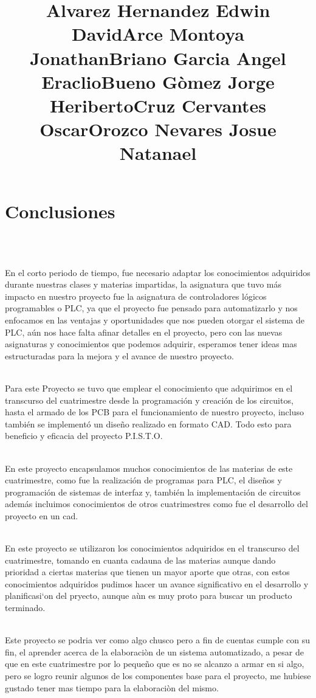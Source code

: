 \documentclass[12pt,a4paper]{article}
\begin{document}
\section{Conclusiones}
\title{\textbf{Alvarez Hernandez Edwin David}}\\

\title{\textbf{Arce Montoya Jonathan}}\\
En el corto periodo de tiempo, fue necesario adaptar los conocimientos adquiridos durante nuestras clases y materias impartidas, la asignatura que tuvo más impacto en nuestro proyecto fue la asignatura de controladores lógicos programables o PLC, ya que el proyecto fue pensado para automatizarlo y nos enfocamos en las ventajas y oportunidades que nos pueden otorgar el sistema de PLC, aún nos hace falta afinar detalles en el proyecto, pero con las nuevas asignaturas y conocimientos que podemos adquirir, esperamos tener ideas mas estructuradas para la mejora y el avance de nuestro proyecto.\\
\title{\textbf{Briano Garcia Angel Eraclio}}\\
Para este Proyecto se tuvo que emplear el conocimiento que adquirimos en el transcurso del cuatrimestre desde la programación y creación de los circuitos, hasta el armado de los 
PCB para el funcionamiento de nuestro proyecto, incluso también se implementó un diseño realizado en formato CAD. Todo esto para beneficio y eficacia del proyecto P.I.S.T.O.\\ 
\title{\textbf{Bueno Gòmez Jorge Heriberto}}\\
En este proyecto encapsulamos muchos conocimientos de las materias de este cuatrimestre, 
como fue la realización de programas para PLC, el diseños y programación de sistemas de interfaz y, también la implementación de circuitos además incluimos conocimientos de otros cuatrimestres como fue el desarrollo del proyecto en un cad.\\
\title{\textbf{Cruz Cervantes Oscar}}\\
En este proyecto se utilizaron los conocimientos adquiridos en el transcurso del cuatrimestre, tomando en cuanta cadauna de las materias aunque dando prioridad a ciertas materias que tienen un mayor aporte que otras, con estos conocimientos adquiridos pudimos hacer un avance significativo en el desarrollo y planificasi`on del pryecto, aunque aùn es muy proto para buscar un producto terminado. \\
\title{\textbf{Orozco Nevares Josue Natanael}}\\
Este proyecto se podria ver como algo chusco pero a fin de cuentas cumple con su fin, el aprender acerca de la elaboraciòn de un sistema automatizado, a pesar de que en este cuatrimestre por lo pequeño que es no se alcanzo a armar en si algo, pero se logro reunir algunos de los componentes base para el proyecto, me hubiese gustado tener mas tiempo para la elaboraciòn del mismo.\\
\end{document}
